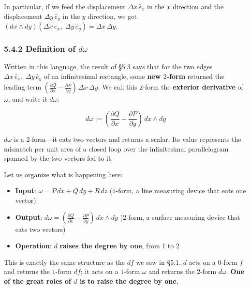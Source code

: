 In particular, if we feed the displacement \(\Delta x\,\hat{e}_x\) in
the \(x\) direction and the displacement \(\Delta y\,\hat{e}_y\) in the
\(y\) direction, we get
\((dx \wedge dy)(\Delta x\,\hat{e}_x,\; \Delta y\,\hat{e}_y) = \Delta x\,\Delta y\).

\hypertarget{definition-of-domega}{%
\subsubsection{\texorpdfstring{5.4.2 Definition of
\(d\omega\)}{5.4.2 Definition of d\textbackslash omega}}\label{definition-of-domega}}

Written in this language, the result of §5.3 says that for the two edges
\(\Delta x\,\hat{e}_x,\; \Delta y\,\hat{e}_y\) of an infinitesimal
rectangle, some \textbf{new $2$-form} returned the leading term
\((\frac{\partial Q}{\partial x} - \frac{\partial P}{\partial y})\,\Delta x\,\Delta y\).
We call this \(2\)-form the \textbf{exterior derivative} of \(\omega\),
and write it \(d\omega\):

\[d\omega := (\frac{\partial Q}{\partial x} - \frac{\partial P}{\partial y})\,dx \wedge dy\]

\(d\omega\) is a \(2\)-form---it eats two vectors and returns a scalar.
Its value represents the mismatch per unit area of a closed loop over
the infinitesimal parallelogram spanned by the two vectors fed to it.

Let us organize what is happening here:

\begin{itemize}
\item
  \textbf{Input}: \(\omega = P\,dx + Q\,dy + R\,dz\) (\(1\)-form, a line
  measuring device that eats one vector)
\item
  \textbf{Output}:
  \(d\omega = (\frac{\partial Q}{\partial x} - \frac{\partial P}{\partial y})\,dx \wedge dy\)
  (\(2\)-form, a surface measuring device that eats two vectors)
\item
  \textbf{Operation}: \(d\) \textbf{raises the degree by one}, from 1 to
  2
\end{itemize}

This is exactly the same structure as the \(df\) we saw in §5.1. \(d\)
acts on a \(0\)-form \(f\) and returns the \(1\)-form \(df\); it acts on
a \(1\)-form \(\omega\) and returns the \(2\)-form \(d\omega\).
\textbf{One of the great roles of $d$ is to raise the degree by one.}

